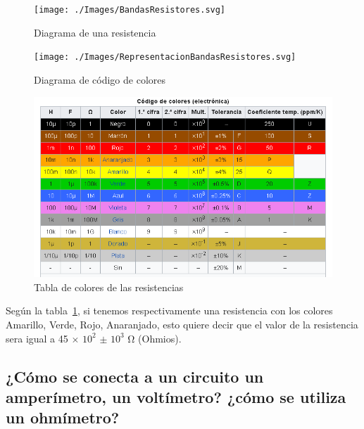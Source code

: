 \documentclass[letterpaper, 12pt]{report}
\begin{document}
\vspace{.5cm}

\begin{figure}[H]
	\begin{center}
		\texttt{[image: ./Images/BandasResistores.svg]}
		\caption{Diagrama de una resistencia}
	\end{center}
\end{figure}

\begin{figure}[H]
	\begin{center}
		\texttt{[image: ./Images/RepresentacionBandasResistores.svg]}
		\caption{Diagrama de código de colores}
	\end{center}
\end{figure}

\begin{figure}[H]
	\centering

	\includegraphics[scale = .65]{./Images/TablaDeColoresResistencias}

	\caption{Tabla de colores de las resistencias}
	\label{Tabla de colores de las resistencias}
\end{figure}

Según la tabla~\ref{Tabla de colores de las resistencias}, si tenemos
respectivamente una resistencia con los colores Amarillo, Verde, Rojo,
Anaranjado, esto quiere decir que el valor de la resistencia sera igual a
45 $\times{}$ $10^2$ $\pm$ $10^3$ Ω (Ohmios).

\subsection{¿Cómo se conecta a un circuito un amperímetro,
	un voltímetro? ¿cómo se utiliza un ohmímetro?}
\end{document}
